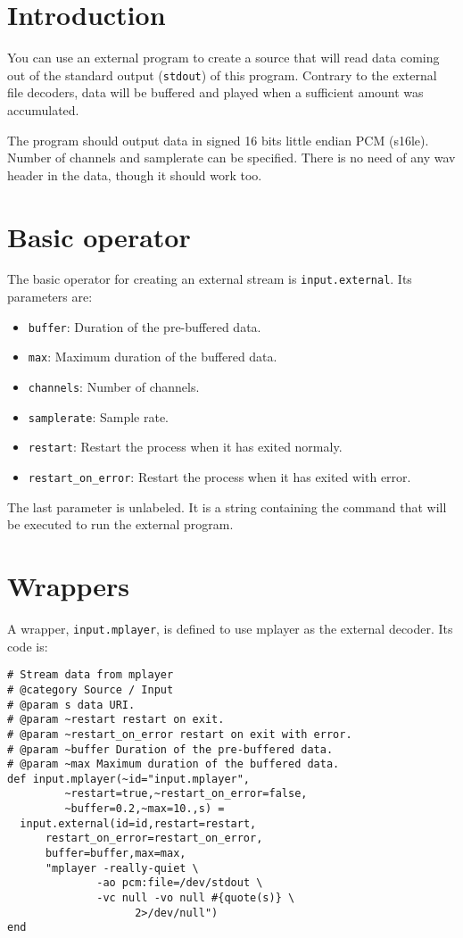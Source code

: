 \section{Introduction }
You can use an external program to create a source that will read data coming out 
of the standard output (\verb+stdout+) of this program. Contrary to the external file decoders,
data will be buffered and played when a sufficient amount was accumulated.

The program should output data in signed 16 bits little endian PCM (s16le). Number of 
channels and samplerate can be specified. There is no need of any wav header in the data,
though it should work too.

\section{Basic operator}
The basic operator for creating an external stream is \verb+input.external+. Its parameters are:

\begin{itemize}
\item \verb+buffer+: Duration of the pre-buffered data.
\item \verb+max+: Maximum duration of the buffered data.
\item \verb+channels+: Number of channels.
\item \verb+samplerate+: Sample rate.
\item \verb+restart+: Restart the process when it has exited normaly.
\item \verb+restart_on_error+: Restart the process when it has exited with error.

\end{itemize}
The last parameter is unlabeled. It is a string containing the command that will be executed to
run the external program.

\section{Wrappers}
A wrapper, \verb+input.mplayer+, is defined to use mplayer as the external decoder.
Its code is:

\begin{verbatim}
# Stream data from mplayer
# @category Source / Input
# @param s data URI.
# @param ~restart restart on exit.
# @param ~restart_on_error restart on exit with error.
# @param ~buffer Duration of the pre-buffered data.
# @param ~max Maximum duration of the buffered data.
def input.mplayer(~id="input.mplayer",
         ~restart=true,~restart_on_error=false,
         ~buffer=0.2,~max=10.,s) =
  input.external(id=id,restart=restart,
      restart_on_error=restart_on_error,
      buffer=buffer,max=max,
      "mplayer -really-quiet \
              -ao pcm:file=/dev/stdout \
              -vc null -vo null #{quote(s)} \
                    2>/dev/null")
end
\end{verbatim}

